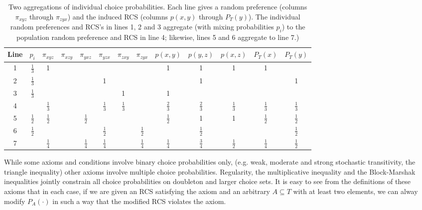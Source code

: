 \documentclass[11pt,letter]{article}
\begin{document}
\begin{table}
	\centering
	\def\arraystretch{1.4}
	\begin{tabular}{cc|cccccc|ccccc}
		Line & $p_i$ & $\pi_{xyz}$ & $\pi_{xzy}$ & $\pi_{yxz}$ & $\pi_{yzx}$ & $\pi_{zxy}$ & $\pi_{zyx}$
		& $p(x,y)$ & $p(y,z)$ & $p(x,z)$ & $P_T(x)$ & $P_T(y)$ \\
		\hline
		1 & $\frac{1}{3}$ & 1 & & & & & & 1 & 1 & 1 & 1 \\
		2 & $\frac{1}{3}$ & & & & 1 & & & & 1 & & & 1 \\
		3 & $\frac{1}{3}$ & & & & & 1 & & 1 \\
		\hline
		4 & & $\frac{1}{3}$ & & & $\frac{1}{3}$ & $\frac{1}{3}$ & & $\frac{2}{3}$ & $\frac{2}{3}$ & $\frac{1}{3}$  & $\frac{1}{3}$  & $\frac{1}{3}$ \\
		\hline
		5 & $\frac{1}{2}$ & $\frac{1}{2}$ & & $\frac{1}{2}$ & & & & $\frac{1}{2}$ & 1 & 1 & $\frac{1}{2}$ & $\frac{1}{2}$ \\
		6 & $\frac{1}{2}$ & & & & $\frac{1}{2}$ & & $\frac{1}{2}$ & & $\frac{1}{2}$ & & & $\frac{1}{2}$ \\
		\hline
		7 & & $\frac{1}{4}$ & & $\frac{1}{4}$ & $\frac{1}{4}$ & & $\frac{1}{4}$ & $\frac{1}{4}$ & $\frac{3}{4}$ & $\frac{1}{2}$ & $\frac{1}{4}$ & $\frac{1}{2}$ \\
		\hline
	\end{tabular}\caption{Two aggregations of individual choice probabilities.
	Each line gives a random preference (columns $\pi_{xyz}$ through $\pi_{zyx}$) and the induced RCS (columns $p(x,y)$ through $P_T(y)$).
	The individual random preferences and RCS's in lines 1, 2 and 3 aggregate (with mixing probabilities $p_i$) to the population random preference and RCS in line 4; likewise, lines 5 and 6 aggregate to line 7.)}\label{t:notconvex}
\end{table}

While some axioms and conditions involve binary choice probabilities only, (e.g. weak, moderate and strong stochastic transitivity, the triangle inequality) other axioms involve multiple choice probabilities.
Regularity, the multiplicative inequality and the Block-Marshak inequalities jointly constrain all choice probabilities on doubleton and larger choice sets.
It is easy to see from the definitions of these axioms that in each case, if we are given an RCS satisfying the axiom and an arbitrary $A \subseteq T$ with at least two elements, we can alway modify $P_A(\cdot)$ in such a way that the modified RCS violates the axiom.
\end{document}
